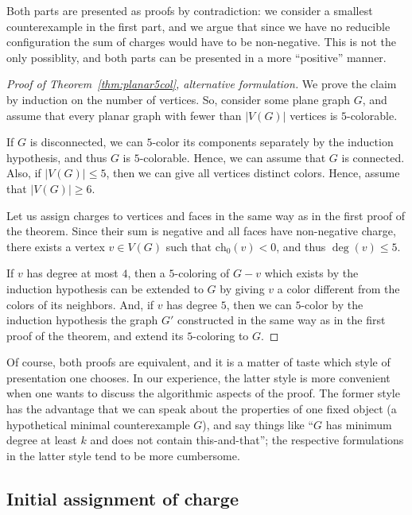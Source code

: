 \documentclass[12pt,twoside,openright,a4paper]{book}
\newcommand{\initch}{\text{ch}_0}
\begin{document}
Both parts are presented as proofs by contradiction: we consider a smallest counterexample in the first part,
and we argue that since we have no reducible configuration the sum of charges would have to be non-negative.
This is not the only possiblity, and both parts can be presented in a more ``positive'' manner.

\begin{proof}[Proof of Theorem~\ref{thm:planar5col}, alternative formulation]
We prove the claim by induction on the number of vertices.  So, consider some plane graph $G$, and assume
that every planar graph with fewer than $|V(G)|$ vertices is $5$-colorable.

If $G$ is disconnected, we can $5$-color its components separately by the induction hypothesis, and thus $G$
is $5$-colorable.  Hence, we can assume that $G$ is connected.  Also, if $|V(G)|\le 5$, then we can give all
vertices distinct colors.  Hence, assume that $|V(G)|\ge 6$.

Let us assign charges to vertices and faces in the same way as in the first proof of the theorem.
Since their sum is negative and all faces have non-negative charge, there exists a vertex $v\in V(G)$
such that $\initch(v)<0$, and thus $\deg(v)\le 5$.

If $v$ has degree at most $4$, then a $5$-coloring of $G-v$ which exists by the induction hypothesis can be extended to $G$ by giving $v$ a color
different from the colors of its neighbors.  And, if $v$ has degree $5$, then we can $5$-color by
the induction hypothesis the graph $G'$ constructed in the same way as in the first proof of the theorem, and extend its
$5$-coloring to $G$.
\end{proof}

Of course, both proofs are equivalent, and it is a matter of taste which style of presentation one chooses.
In our experience, the latter style is more convenient when one wants to discuss the algorithmic aspects of the proof.
The former style has the advantage that we can speak about the properties of one fixed object (a hypothetical minimal
counterexample $G$), and say things like ``$G$ has minimum degree at least $k$ and does not contain this-and-that'';
the respective formulations in the latter style tend to be more cumbersome.

\subsection{Initial assignment of charge}\label{ssec:initch}
\end{document}
